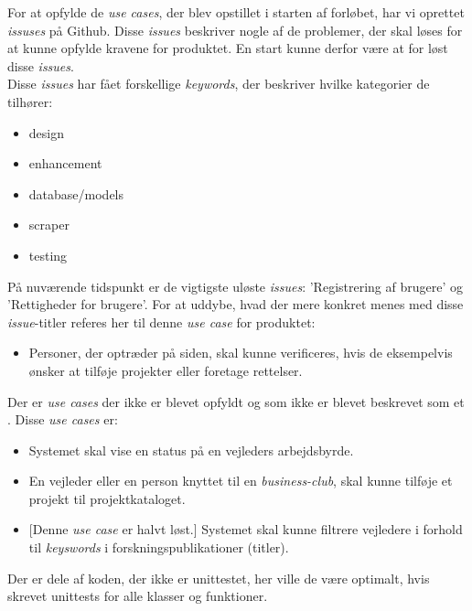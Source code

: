 \documentclass[11pt]{article}
\begin{document}
For at opfylde de \textit{use cases}, der blev opstillet i starten af forløbet, har vi oprettet \textit{issuses} på Github. Disse \textit{issues} beskriver nogle af de problemer, der skal løses for at kunne opfylde kravene for produktet. En start kunne derfor være at for løst disse \textit{issues}. \\
Disse \textit{issues} har fået forskellige \textit{keywords}, der beskriver hvilke kategorier de tilhører:
\begin{itemize}
	\item{design}
	\item{enhancement}
	\item{database/models}
	\item{scraper}
	\item{testing}
\end{itemize}
På nuværende tidspunkt er de vigtigste uløste \textit{issues}: 'Registrering af brugere' og 'Rettigheder for brugere'. For at uddybe, hvad der mere konkret menes med disse \textit{issue}-titler referes her til denne \textit{use case} for produktet:
\begin{itemize}
 \item[]{Personer, der optræder på siden, skal kunne verificeres, hvis de eksempelvis ønsker at tilføje projekter eller foretage rettelser.}
\end{itemize}
Der er \textit{use cases} der ikke er blevet opfyldt og som ikke er blevet beskrevet som et . Disse \textit{use cases} er:

\begin{itemize}
\item{Systemet skal vise en status på en vejleders arbejdsbyrde.}
\item{En vejleder eller en person knyttet til en \textit{business-club}, skal kunne tilføje et projekt til projektkataloget.}
\item{[Denne \textit{use case} er halvt løst.] Systemet skal kunne filtrere vejledere i forhold til \textit{keyswords} i forskningspublikationer (titler).}
\end{itemize}

Der er dele af koden, der ikke er unittestet, her ville de være optimalt, hvis skrevet unittests for alle klasser og funktioner.
\end{document}
